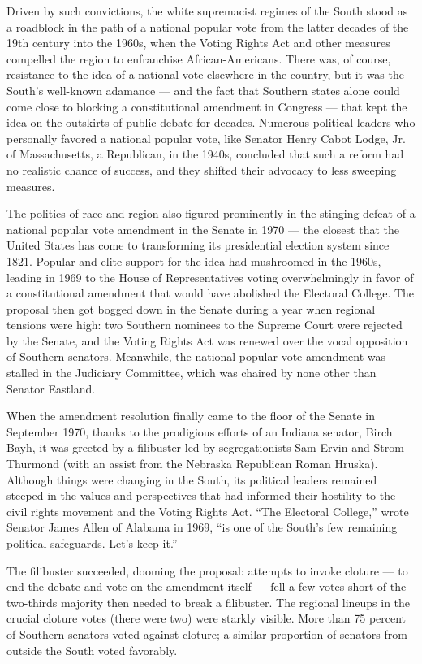 Driven by such convictions, the white supremacist regimes of the South
stood as a roadblock in the path of a national popular vote from the
latter decades of the 19th century into the 1960s, when the Voting
Rights Act and other measures compelled the region to enfranchise
African-Americans. There was, of course, resistance to the idea of a
national vote elsewhere in the country, but it was the South's
well-known adamance --- and the fact that Southern states alone could
come close to blocking a constitutional amendment in Congress --- that
kept the idea on the outskirts of public debate for decades. Numerous
political leaders who personally favored a national popular vote, like
Senator Henry Cabot Lodge, Jr. of Massachusetts, a Republican, in the
1940s, concluded that such a reform had no realistic chance of success,
and they shifted their advocacy to less sweeping measures.

The politics of race and region also figured prominently in the stinging
defeat of a national popular vote amendment in the Senate in 1970 ---
the closest that the United States has come to transforming its
presidential election system since 1821. Popular and elite support for
the idea had mushroomed in the 1960s, leading in 1969 to the House of
Representatives voting overwhelmingly in favor of a constitutional
amendment that would have abolished the Electoral College. The proposal
then got bogged down in the Senate during a year when regional tensions
were high: two Southern nominees to the Supreme Court were rejected by
the Senate, and the Voting Rights Act was renewed over the vocal
opposition of Southern senators. Meanwhile, the national popular vote
amendment was stalled in the Judiciary Committee, which was chaired by
none other than Senator Eastland.

When the amendment resolution finally came to the floor of the Senate in
September 1970, thanks to the prodigious efforts of an Indiana senator,
Birch Bayh, it was greeted by a filibuster led by segregationists Sam
Ervin and Strom Thurmond (with an assist from the Nebraska Republican
Roman Hruska). Although things were changing in the South, its political
leaders remained steeped in the values and perspectives that had
informed their hostility to the civil rights movement and the Voting
Rights Act. ``The Electoral College,'' wrote Senator James Allen of
Alabama in 1969, ``is one of the South's few remaining political
safeguards. Let's keep it.''

The filibuster succeeded, dooming the proposal: attempts to invoke
cloture --- to end the debate and vote on the amendment itself --- fell
a few votes short of the two-thirds majority then needed to break a
filibuster. The regional lineups in the crucial cloture votes (there
were two) were starkly visible. More than 75 percent of Southern
senators voted against cloture; a similar proportion of senators from
outside the South voted favorably.


